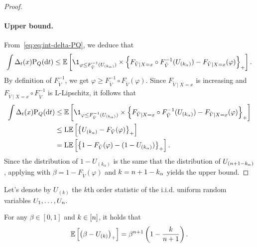 \begin{proof}
\paragraph{Upper bound.}
  From~\eqref{eq:eq:int-delta-PQ}, we deduce that
  \begin{equation}
    \int \Delta_{t}(x) \textup{P}_Q(\rmd t)
    \le \E\br{ \1_{\varphi \le F_{\tilde{V}}^{-1}(U_{(k_\alpha)})} \times \ac{ F_{\tilde{V}\mid X=x}\circ F_{\tilde{V}}^{-1}(U_{(k_{\alpha})}) - F_{\tilde{V}\mid X=x}(\varphi) }_{+} }.
  \end{equation}
  By definition of $F_{\tilde{V}}^{-1}$, we get $\varphi \ge F_{\tilde{V}}^{-1} \circ F_{\tilde{V}}(\varphi)$.
  Since $F_{\tilde{V}\mid X=x}$ is increasing and $F_{\tilde{V}\mid X=x}\circ F_{\tilde{V}}^{-1}$ is $\mathrm{L}$-Lipschitz, it follows that
  \begin{align*}
    \int \Delta_{t}(x) \textup{P}_Q(\rmd t)
    &\le \E\br{ \1_{\varphi \le F_{\tilde{V}}^{-1}(U_{(k_\alpha)})} \times \ac{ F_{\tilde{V}\mid X=x}\circ F_{\tilde{V}}^{-1}(U_{(k_{\alpha})}) - F_{\tilde{V}\mid X=x}(\varphi) }_{+} }
    \\
    &\le \mathrm{L} \E\br{ \ac{ U_{(k_{\alpha})} - F_{\tilde{V}}(\varphi) }_{+} }
    \\
    &= \mathrm{L} \E\br{ \ac{ 1 - F_{\tilde{V}}(\varphi) - (1 - U_{(k_{\alpha})}) }_{+} }.
  \end{align*}
  Since the distribution of $1 - U_{(k_{\alpha})}$ is the same that the distribution of $U_{(n+1-k_{\alpha})}$, applying  with $\beta=1-F_{\tilde{V}}(\varphi)$ and $k=n+1-k_{\alpha}$ yields the upper bound.
\end{proof}

Let's denote by $U_{(k)}$ the $k$th order statistic of the i.i.d. uniform random variables $U_1,\ldots,U_{n}$.
\begin{lemma}\label{lem:bound:expec-1alphaU}
  For any $\beta\in[0,1]$ and $k\in[n]$, it holds that
  \begin{equation*}
    \mathbb{E}\left[{\left({\beta - U_{(k)}}\right)_{+}}\right]
    = \beta^{n+1} \left({1 - \frac{k}{n+1}}\right).
  \end{equation*}
\end{lemma}

